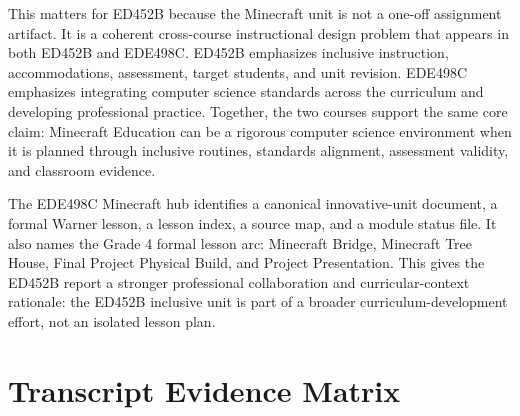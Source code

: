 \documentclass[12pt]{article}
\begin{document}
This matters for ED452B because the Minecraft unit is not a one-off assignment artifact. It is a coherent cross-course instructional design problem that appears in both ED452B and EDE498C. ED452B emphasizes inclusive instruction, accommodations, assessment, target students, and unit revision. EDE498C emphasizes integrating computer science standards across the curriculum and developing professional practice. Together, the two courses support the same core claim: Minecraft Education can be a rigorous computer science environment when it is planned through inclusive routines, standards alignment, assessment validity, and classroom evidence.

The EDE498C Minecraft hub identifies a canonical innovative-unit document, a formal Warner lesson, a lesson index, a source map, and a module status file. It also names the Grade 4 formal lesson arc: Minecraft Bridge, Minecraft Tree House, Final Project Physical Build, and Project Presentation. This gives the ED452B report a stronger professional collaboration and curricular-context rationale: the ED452B inclusive unit is part of a broader curriculum-development effort, not an isolated lesson plan.

\section{Transcript Evidence Matrix}
\end{document}
